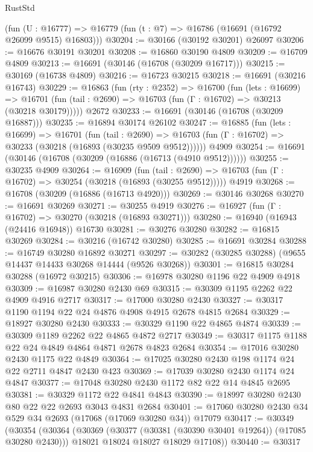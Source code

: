 \begin{lexlean}{RustStd}
\begin{coremodule}
    (fun (U : @16777) => @16779 (fun (t : @7) => @16786 (@16691 (@16792 @26099 @9515) @16803)))
@30204 := @30166 (@30192 @30201) @26097
@30206 := @16676 @30191 @30201
@30208 := @16860 @30190 @4809
@30209 := @16709 @4809
@30213 := @16691 (@30146 (@16708 (@30209 @16717)))
@30215 := @30169 (@16738 @4809)
@30216 := @16723 @30215
@30218 := @16691 (@30216 @16743)
@30229 := @16863
    (fun (rty : @2352) =>
    @16700
      (fun (lets : @16699) =>
      @16701 (fun (tail : @2690) => @16703 (fun (Γ : @16702) => @30213 (@30218 @30179)))))
    @2672
@30233 := @16691 (@30146 (@16708 (@30209 @16887)))
@30235 := @16894 @30174 @26102
@30247 := @16885
    (fun (lets : @16699) =>
    @16701
      (fun (tail : @2690) =>
      @16703 (fun (Γ : @16702) => @30233 (@30218 (@16893 (@30235 @9509 @9512))))))
    @4909
@30254 := @16691 (@30146 (@16708 (@30209 (@16886 (@16713 (@4910 @9512))))))
@30255 := @30235 @4909
@30264 := @16909
    (fun (tail : @2690) => @16703 (fun (Γ : @16702) => @30254 (@30218 (@16893 (@30255 @9512)))))
    @4919
@30268 := @16708 (@30209 (@16886 (@16713 @4920)))
@30269 := @30146 @30268
@30270 := @16691 @30269
@30271 := @30255 @4919
@30276 := @16927 (fun (Γ : @16702) => @30270 (@30218 (@16893 @30271)))
@30280 := @16940 (@16943 (@24416 @16948)) @16730
@30281 := @30276 @30280
@30282 := @16815 @30269
@30284 := @30216 (@16742 @30280)
@30285 := @16691 @30284
@30288 := @16749 @30280 @16892 @30271
@30297 := @30282 (@30285 @30288) (@9655 @14437 @14433 @30268 @14444 (@9526 @30268))
@30301 := @16815 @30284 @30288 (@16972 @30215)
@30306 := @16978 @30280 @1196 @22 @4909 @4918
@30309 := @16987 @30280 @2430 @69
@30315 := @30309 @1195 @2262 @22 @4909 @4916 @2717
@30317 := @17000 @30280 @2430
@30327 := @30317 @1190 @1194 @22 @24 @4876 @4908 @4915 @2678 @4815 @2684
@30329 := @18927 @30280 @2430
@30333 := @30329 @1190 @22 @4865 @4874
@30339 := @30309 @1189 @2262 @22 @4865 @4872 @2717
@30349 := @30317 @1175 @1188 @22 @24 @4849 @4864 @4871 @2678 @4823 @2684
@30354 := @17016 @30280 @2430 @1175 @22 @4849
@30364 := @17025 @30280 @2430 @198 @1174 @24 @22 @2711 @4847 @2430 @423
@30369 := @17039 @30280 @2430 @1174 @24 @4847
@30377 := @17048 @30280 @2430 @1172 @82 @22 @14 @4845 @2695
@30381 := @30329 @1172 @22 @4841 @4843
@30390 := @18997 @30280 @2430 @80 @22 @22 @2693 @3043 @4831 @2684
@30401 := @17060 @30280 @2430 @34 @529 @34 @2693 (@17068 (@17069 @30280 @34)) @17079
@30417 := @30349
    (@30354
      (@30364
        (@30369 (@30377 (@30381 (@30390 @30401 @19264)) (@17085 @30280 @2430)))
        @18021
        @18024
        @18027
        @18029
        @17108))
@30440 := @30317

\end{coremodule}
\end{lexlean}
